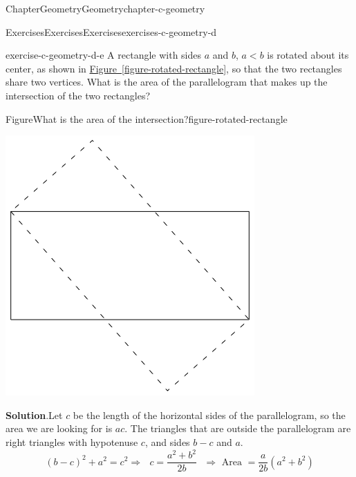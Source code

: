 \documentclass[oneside,10pt,]{book}
\newcommand{\blocktitlefont}{\relax}
\newcommand{\xreffont}{\relax}
\numberwithin{equation}{section}
\newcommand{\lt}{<}
\begin{document}
\begin{chapterptx}{Chapter}{Geometry}{}{Geometry}{}{}{chapter-c-geometry}
\begin{exercises-section}{Exercises}{Exercises}{}{Exercises}{}{}{exercises-c-geometry-d}
\begin{divisionexercise}{4}{}{}{exercise-c-geometry-d-e}%
A rectangle with sides \(a\) and \(b\), \(a \lt b\) is rotated about its center, as shown in \hyperref[figure-rotated-rectangle]{Figure~{\xreffont\ref{figure-rotated-rectangle}}}, so that the two rectangles share two vertices. What is the area of the parallelogram that makes up the intersection of the two rectangles?%
\begin{figureptx}{Figure}{What is the area of the intersection?}{figure-rotated-rectangle}{}%
\begin{image}{0.2}{0.6}{0.2}%
\includegraphics[width=\linewidth]{images/rotated-rectangle.png}
\end{image}%
\tcblower
\end{figureptx}%
\par\smallskip%
\noindent\textbf{\blocktitlefont Solution}.\hypertarget{solution-c-geometry-d-e-b}{}\quad{}Let \(c\) be the length of the horizontal sides of the parallelogram, so the area we are looking for is \(a c\). The triangles that are outside the parallelogram are right triangles with hypotenuse \(c\), and sides \(b-c\) and \(a\).%
\begin{equation*}
(b-c)^2+a^2= c^2 \Rightarrow \textrm{   }c=\frac{a^2+ b^2}{2b }\textrm{  }\Rightarrow \textrm{  Area } =\frac{a}{2b} \left(a^2+ b^2\right)

\end{equation*}
\end{divisionexercise}
\end{exercises-section}
\end{chapterptx}
\end{document}
